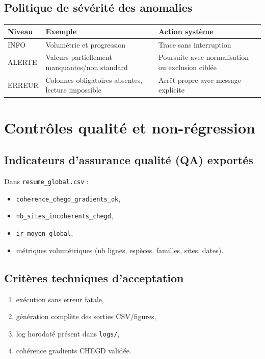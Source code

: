 \documentclass[11pt,a4paper]{article}
\begin{document}
\subsection{Politique de sévérité des anomalies}
\begin{center}\begin{tabular}{>{\raggedright\arraybackslash}p{}>{\raggedright\arraybackslash}p{}>{\raggedright\arraybackslash}p{}}
\toprule
\textbf{Niveau} & \textbf{Exemple} & \textbf{Action système} \\
\midrule
INFO & Volumétrie et progression & Trace sans interruption \\
ALERTE & Valeurs partiellement manquantes/non standard & Poursuite avec normalisation ou exclusion ciblée \\
ERREUR & Colonnes obligatoires absentes, lecture impossible & Arrêt propre avec message explicite \\
\bottomrule
\end{tabular}\end{center}

\section{Contrôles qualité et non-régression}
\subsection{Indicateurs d'assurance qualité (QA) exportés}
Dans \texttt{resume\_global.csv} :
\begin{itemize}[leftmargin=1.2cm]
  \item \texttt{coherence\_chegd\_gradients\_ok},
  \item \texttt{nb\_sites\_incoherents\_chegd},
  \item \texttt{ir\_moyen\_global},
  \item métriques volumétriques (nb lignes, espèces, familles, sites, dates).
\end{itemize}

\subsection{Critères techniques d'acceptation}
\begin{enumerate}[leftmargin=1.2cm]
  \item exécution sans erreur fatale,
  \item génération complète des sorties CSV/figures,
  \item log horodaté présent dans \texttt{logs/},
  \item cohérence gradients CHEGD validée.
\end{enumerate}
\end{document}
